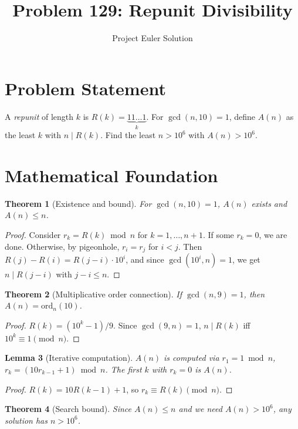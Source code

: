 \documentclass[11pt,a4paper]{article}
\title{Problem 129: Repunit Divisibility}
\author{Project Euler Solution}
\date{}
\newtheorem{theorem}{Theorem}
\newtheorem{lemma}[theorem]{Lemma}
\begin{document}
\maketitle

\section{Problem Statement}

A \emph{repunit} of length $k$ is $R(k) = \underbrace{11\ldots1}_{k}$. For $\gcd(n, 10) = 1$, define $A(n)$ as the least $k$ with $n \mid R(k)$. Find the least $n > 10^6$ with $A(n) > 10^6$.

\section{Mathematical Foundation}

\begin{theorem}[Existence and bound]
For $\gcd(n, 10) = 1$, $A(n)$ exists and $A(n) \le n$.
\end{theorem}

\begin{proof}
Consider $r_k = R(k) \bmod n$ for $k = 1, \ldots, n+1$. If some $r_k = 0$, we are done. Otherwise, by pigeonhole, $r_i = r_j$ for $i < j$. Then $R(j) - R(i) = R(j-i) \cdot 10^i$, and since $\gcd(10^i, n) = 1$, we get $n \mid R(j-i)$ with $j - i \le n$.
\end{proof}

\begin{theorem}[Multiplicative order connection]
If $\gcd(n, 9) = 1$, then $A(n) = \mathrm{ord}_n(10)$.
\end{theorem}

\begin{proof}
$R(k) = (10^k - 1)/9$. Since $\gcd(9, n) = 1$, $n \mid R(k)$ iff $10^k \equiv 1 \pmod{n}$.
\end{proof}

\begin{lemma}[Iterative computation]
$A(n)$ is computed via $r_1 = 1 \bmod n$, $r_k = (10r_{k-1} + 1) \bmod n$. The first $k$ with $r_k = 0$ is $A(n)$.
\end{lemma}

\begin{proof}
$R(k) = 10 R(k-1) + 1$, so $r_k \equiv R(k) \pmod{n}$.
\end{proof}

\begin{theorem}[Search bound]
Since $A(n) \le n$ and we need $A(n) > 10^6$, any solution has $n > 10^6$.
\end{theorem}
\end{document}
